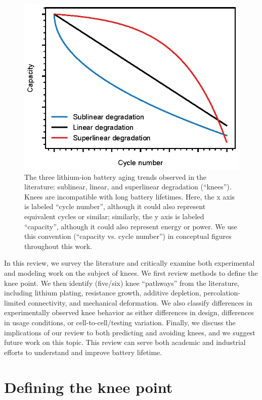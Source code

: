 \documentclass{article}
\begin{document}
\begin{figure}[ht]
\centering
\includegraphics[scale=1]{figures/degradation_rates.eps}
\caption{The three lithium-ion battery aging trends observed in the literature: sublinear, linear, and superlinear degradation (``knees''). Knees are incompatible with long battery lifetimes. Here, the x axis is labeled ``cycle number'', although it could also represent equivalent cycles or similar; similarly, the y axis is labeled ``capacity'', although it could also represent energy or power. We use this convention (``capacity vs. cycle number'') in conceptual figures throughout this work.}
\label{fig:degradation_shapes}
\end{figure}


In this review, we survey the literature and critically examine both experimental and modeling work on the subject of knees. We first review methods to define the knee point. We then identify (five/six) knee ``pathways'' from the literature, including lithium plating, resistance growth, additive depletion, percolation-limited connectivity, and mechanical deformation. We also classify differences in experimentally observed knee behavior as either differences in design, differences in usage conditions, or cell-to-cell/testing variation. Finally, we discuss the implications of our review to both predicting and avoiding knees, and we suggest future work on this topic. This review can serve both academic and industrial efforts to understand and improve battery lifetime.

\newpage
\section{Defining the knee point}
\end{document}

